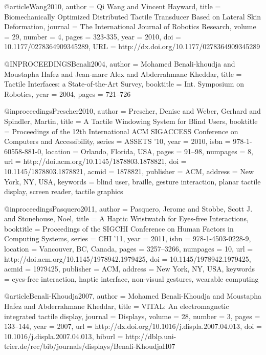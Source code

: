@article{Wang2010,
author = { Qi Wang and Vincent Hayward},
title = {{Biomechanically Optimized Distributed Tactile Transducer Based on Lateral Skin Deformation}},
journal = {The International Journal of Robotics Research},
volume = {29},
number = {4},
pages = {323-335},
year = {2010},
doi = {10.1177/0278364909345289},
URL = {http://dx.doi.org/10.1177/0278364909345289}
}

@INPROCEEDINGS{Benali2004,
author = {Mohamed Benali-khoudja and Moustapha Hafez and Jean-marc Alex and Abderrahmane Kheddar},
title = {{Tactile Interfaces: a State-of-the-Art Survey}},
booktitle = {Int. Symposium on Robotics},
year = {2004},
pages = {721--726}
}

@inproceedings{Prescher2010,
 author = {Prescher, Denise and Weber, Gerhard and Spindler, Martin},
 title = {{A Tactile Windowing System for Blind Users}},
 booktitle = {Proceedings of the 12th International ACM SIGACCESS Conference on Computers and Accessibility},
 series = {ASSETS '10},
 year = {2010},
 isbn = {978-1-60558-881-0},
 location = {Orlando, Florida, USA},
 pages = {91--98},
 numpages = {8},
 url = {http://doi.acm.org/10.1145/1878803.1878821},
 doi = {10.1145/1878803.1878821},
 acmid = {1878821},
 publisher = {ACM},
 address = {New York, NY, USA},
 keywords = {blind user, braille, gesture interaction, planar tactile display, screen reader, tactile graphics}
} 

@inproceedings{Pasquero2011,
 author = {Pasquero, Jerome and Stobbe, Scott J. and Stonehouse, Noel},
 title = {{A Haptic Wristwatch for Eyes-free Interactions}},
 booktitle = {Proceedings of the SIGCHI Conference on Human Factors in Computing Systems},
 series = {CHI '11},
 year = {2011},
 isbn = {978-1-4503-0228-9},
 location = {Vancouver, BC, Canada},
 pages = {3257--3266},
 numpages = {10},
 url = {http://doi.acm.org/10.1145/1978942.1979425},
 doi = {10.1145/1978942.1979425},
 acmid = {1979425},
 publisher = {ACM},
 address = {New York, NY, USA},
 keywords = {eyes-free interaction, haptic interface, non-visual gestures, wearable computing}
} 

@article{Benali-Khoudja2007,
author    = {Mohamed Benali{-}Khoudja and
               Moustapha Hafez and
               Abderrahmane Kheddar},
title     = {{VITAL: An electromagnetic integrated tactile display}},
journal   = {Displays},
volume    = {28},
number    = {3},
pages     = {133--144},
year      = {2007},
url       = {http://dx.doi.org/10.1016/j.displa.2007.04.013},
doi       = {10.1016/j.displa.2007.04.013},
biburl    = {http://dblp.uni-trier.de/rec/bib/journals/displays/Benali-KhoudjaH07}
}

